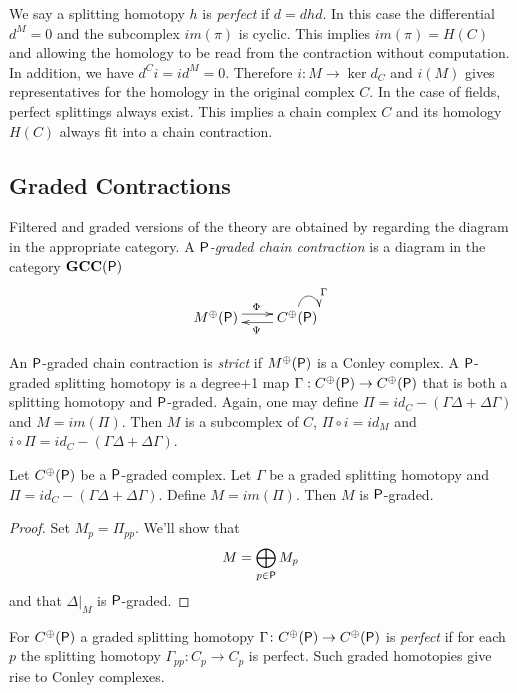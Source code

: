 We say a splitting homotopy $h$ is {\em perfect} if $d=dhd$.  In this case the differential $d^M=0$ and the subcomplex $im(\pi)$ is cyclic.  This implies $im(\pi)=H(C)$ and allowing the homology to be read from the contraction without computation.  In addition, we have $d^Ci = id^M = 0$.  Therefore $i:M\to \ker d_C$ and $i(M)$ gives representatives for the homology in the original complex $C$. In the case of fields, perfect splittings always exist.  This implies a chain complex $C$ and its homology $H(C)$ always fit into a chain contraction.


\subsection{Graded Contractions}

Filtered and graded versions of the theory are obtained by regarding the diagram in the appropriate category.  A {\em ${\mathsf P}$-graded chain contraction} is a diagram in the category ${\bf GCC({\mathsf P})}$
 \[
\xymatrixrowsep{0.03in}
\xymatrixcolsep{0.3in}
\xymatrix{
M^\oplus(\sP)  \ar[r]<3pt>^{\Phi} & \ar[l]<3pt>^{\Psi} C^\oplus(\sP) \ar@(u,r)^{\Gamma}
}
\]

 An ${\mathsf P}$-graded chain contraction is {\em strict} if $M^\oplus({\mathsf P})$ is a Conley complex.  A ${\mathsf P}$-graded splitting homotopy is a degree+1 map $\Gamma:C^\oplus({\mathsf P})\to C^\oplus({\mathsf P})$ that is both a splitting homotopy and ${\mathsf P}$-graded.    Again, one may define $\Pi=id_C-(\Gamma\Delta+\Delta\Gamma)$ and $M=im(\Pi)$.  Then $M$ is a subcomplex of $C$, $\Pi \circ i = id_M$ and $i\circ \Pi = id_C-(\Gamma\Delta+\Delta\Gamma)$.  
  
\begin{prop}\label{prop:grad:contract}
Let $C^\oplus({\mathsf P})$ be a ${\mathsf P}$-graded complex.  Let $\Gamma$ be a graded splitting homotopy and $\Pi = id_C-(\Gamma\Delta+\Delta\Gamma)$.  Define $M = im(\Pi)$.  Then $M$ is ${\mathsf P}$-graded.
\end{prop}
\begin{proof}
Set $M_p = \Pi_{pp}$.  We'll show that  $$M=\bigoplus_{p\in {\mathsf P}} M_p$$ and that $\Delta|_M$ is ${\mathsf P}$-graded. 



\end{proof}


For $C^\oplus({\mathsf P})$ a graded splitting homotopy $\Gamma\colon C^\oplus({\mathsf P})\to C^\oplus({\mathsf P})$ is {\em perfect} if for each $p$ the splitting homotopy $\Gamma_{pp}:C_p\to C_p$ is perfect.  Such graded homotopies give rise to Conley complexes.

